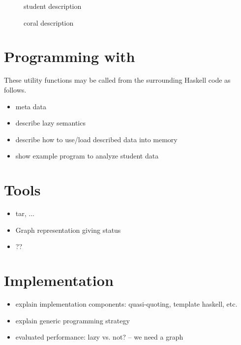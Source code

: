 \documentclass[natbib]{sigplanconf}
\begin{document}
\begin{figure}

\caption{\forest{} student description}
\label{fig:student-description}
\end{figure}

\begin{figure}

\caption{\forest{} coral description}
\label{fig:coral-description}
\end{figure}

\section{Programming with \forest{}}
\label{sec:exp}

These utility functions may be called from the surrounding Haskell code as follows.

\begin{itemize}
\item meta data
\item describe lazy semantics
\item describe how to use/load described data into memory
\item show example program to analyze student data
\end{itemize}

\section{Tools}
\label{sec:tools}
\begin{itemize}
\item tar, ...
\item Graph representation giving status
\item ??
\end{itemize}


\section{Implementation}

\begin{itemize}
\item explain implementation components: quasi-quoting, template haskell, etc.
\item explain generic programming strategy
\item evaluated performance: lazy vs. not? -- we need a graph
\end{itemize}
\end{document}
